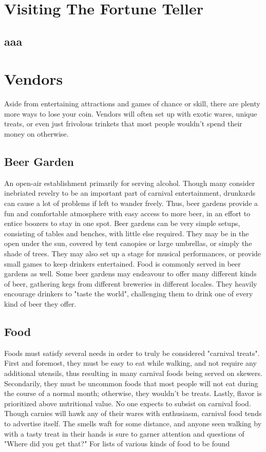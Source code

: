 \documentclass[10pt,a4paper,twoside,twocolumn,openany,bg=print,nodeprecatedcode]{dndbook}
\begin{document}
\chapter{Visiting The Fortune Teller}

\section{aaa}

\chapter{Vendors}
Aside from entertaining attractions and games of chance or skill, there are plenty more ways to lose your coin. Vendors will often set up with exotic wares, unique treats, or even just frivolous trinkets that most people wouldn't spend their money on otherwise.
\section{Beer Garden }
An open-air establishment primarily for serving alcohol. Though many consider inebriated revelry to be an important part of carnival entertainment, drunkards can cause a lot of problems if left to wander freely. Thus, beer gardens provide a fun and comfortable atmosphere with easy access to more beer, in an effort to entice boozers to stay in one spot.
Beer gardens can be very simple setups, consisting of tables and benches, with little else required. They may be in the open under the sun, covered by tent canopies or large umbrellas, or simply the shade of trees. They may also set up a stage for musical performances, or provide small games to keep drinkers entertained.
Food is commonly served in beer gardens as well. Some beer gardens may endeavour to offer many different kinds of beer, gathering kegs from different breweries in different locales. They heavily encourage drinkers to "taste the world", challenging them to drink one of every kind of beer they offer.
\section{Food}
Foods must satisfy several needs in order to truly be considered "carnival treats". First and foremost, they must be easy to eat while walking, and not require any additional utensils, thus resulting in many carnival foods being served on skewers. Secondarily, they must be uncommon foods that most people will not eat during the course of a normal month; otherwise, they wouldn't be treats. Lastly, flavor is prioritized above nutritional value. No one expects to subsist on carnival food.
Though carnies will hawk any of their wares with enthusiasm, carnival food tends to advertise itself. The smells waft for some distance, and anyone seen walking by with a tasty treat in their hands is sure to garner attention and questions of "Where did you get that?"
For lists of various kinds of food to be found
\end{document}
